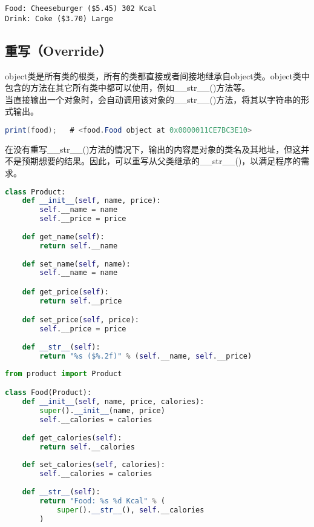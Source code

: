\begin{tcolorbox}
    \begin{verbatim}
Food: Cheeseburger ($5.45) 302 Kcal
Drink: Coke ($3.70) Large
	\end{verbatim}
\end{tcolorbox}

\vspace{0.5cm}

\subsection{重写（Override）}

object类是所有类的根类，所有的类都直接或者间接地继承自object类。object类中包含的方法在其它所有类中都可以使用，例如\_\_str\_\_()方法等。\\

当直接输出一个对象时，会自动调用该对象的\_\_str\_\_()方法，将其以字符串的形式输出。

\vspace{-0.5cm}

\begin{lstlisting}[language=Java]
print(food);   # <food.Food object at 0x0000011CE7BC3E10>
\end{lstlisting}

在没有重写\_\_str\_\_()方法的情况下，输出的内容是对象的类名及其地址，但这并不是预期想要的结果。因此，可以重写从父类继承的\_\_str\_\_()，以满足程序的需求。\\


\begin{lstlisting}[language=Python]
class Product:
    def __init__(self, name, price):
        self.__name = name
        self.__price = price
    
    def get_name(self):
        return self.__name
    
    def set_name(self, name):
        self.__name = name

    def get_price(self):
        return self.__price

    def set_price(self, price):
        self.__price = price
    
    def __str__(self):
        return "%s ($%.2f)" % (self.__name, self.__price)
\end{lstlisting}

\begin{lstlisting}[language=Python]
from product import Product

class Food(Product):
    def __init__(self, name, price, calories):
        super().__init__(name, price)
        self.__calories = calories
    
    def get_calories(self):
        return self.__calories
    
    def set_calories(self, calories):
        self.__calories = calories
    
    def __str__(self):
        return "Food: %s %d Kcal" % (
            super().__str__(), self.__calories
        )
\end{lstlisting}


